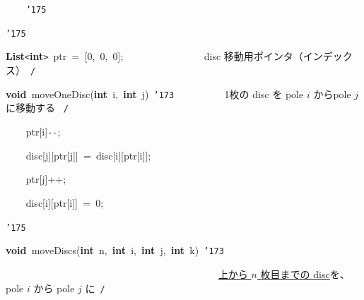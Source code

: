 \documentclass[a4paper,10pt]{article}
\def\mc{\relax}
\begin{document}
\noindent
\mbox{}{\tt\mc \ }{\tt\mc \ }{\tt\mc \ }{\tt\mc \ }{\tt\char'175}

\noindent
\mbox{}{\tt\char'175}

\noindent
\mbox{}\hfill

\noindent
\mbox{}\textbf{List}{\tt <}\textbf{int}{\tt >}{\tt\mc \ }ptr{\tt\mc \ }={\tt\mc \ }[0,{\tt\mc \ }0,{\tt\mc \ }0];{\tt\mc \ }{\tt\mc \ }{\tt\mc \ }{\tt\mc \ }{\tt\mc \ }{\tt\mc \ }{\tt\mc \ }{\tt\mc \ }{\tt\mc \ }{\tt\mc \ }{\tt\mc \ }{\tt\mc \ }{\tt\mc \ }{\tt\mc \ }\rm\mc {\tt /}{\tt *}\  \ disc 移動用ポインタ（インデックス）\hfill \rm\mc \ {\tt *}{\tt /}
\tt\mc 

\noindent
\mbox{}\hfill

\noindent
\mbox{}\textbf{void}{\tt\mc \ }moveOneDisc(\textbf{int}{\tt\mc \ }i,{\tt\mc \ }\textbf{int}{\tt\mc \ }j){\tt\mc \ }{\tt\char'173}{\tt\mc \ }{\tt\mc \ }{\tt\mc \ }{\tt\mc \ }{\tt\mc \ }{\tt\mc \ }{\tt\mc \ }{\tt\mc \ }\rm\mc {\tt /}{\tt *}\  \ 1枚の disc を pole $i$ からpole $j$ に移動する \hfill \rm\mc \ {\tt *}{\tt /}
\tt\mc 

\noindent
\mbox{}{\tt\mc \ }{\tt\mc \ }{\tt\mc \ }{\tt\mc \ }ptr[i]{\tt -}{\tt -};

\noindent
\mbox{}{\tt\mc \ }{\tt\mc \ }{\tt\mc \ }{\tt\mc \ }disc[j][ptr[j]]{\tt\mc \ }={\tt\mc \ }disc[i][ptr[i]];

\noindent
\mbox{}{\tt\mc \ }{\tt\mc \ }{\tt\mc \ }{\tt\mc \ }ptr[j]++;

\noindent
\mbox{}{\tt\mc \ }{\tt\mc \ }{\tt\mc \ }{\tt\mc \ }disc[i][ptr[i]]{\tt\mc \ }={\tt\mc \ }0;

\noindent
\mbox{}{\tt\char'175}

\noindent
\mbox{}\hfill

\noindent
\mbox{}\textbf{void}{\tt\mc \ }moveDiscs(\textbf{int}{\tt\mc \ }n,{\tt\mc \ }\textbf{int}{\tt\mc \ }i,{\tt\mc \ }\textbf{int}{\tt\mc \ }j,{\tt\mc \ }\textbf{int}{\tt\mc \ }k){\tt\mc \ }{\tt\char'173}

\noindent
\mbox{}{\tt\mc \ }{\tt\mc \ }{\tt\mc \ }{\tt\mc \ }{\tt\mc \ }{\tt\mc \ }{\tt\mc \ }{\tt\mc \ }{\tt\mc \ }{\tt\mc \ }{\tt\mc \ }{\tt\mc \ }{\tt\mc \ }{\tt\mc \ }{\tt\mc \ }{\tt\mc \ }{\tt\mc \ }{\tt\mc \ }{\tt\mc \ }{\tt\mc \ }{\tt\mc \ }{\tt\mc \ }{\tt\mc \ }{\tt\mc \ }{\tt\mc \ }{\tt\mc \ }{\tt\mc \ }{\tt\mc \ }{\tt\mc \ }{\tt\mc \ }{\tt\mc \ }{\tt\mc \ }{\tt\mc \ }{\tt\mc \ }{\tt\mc \ }{\tt\mc \ }{\tt\mc \ }{\tt\mc \ }{\tt\mc \ }{\tt\mc \ }\rm\mc {\tt /}{\tt *}\  \ \underline{\textsf{上から $n$ 枚目までの disc}}を、pole $i$ から pole $j$ に\hfill \rm\mc \ {\tt *}{\tt /}
\tt\mc 
\end{document}
